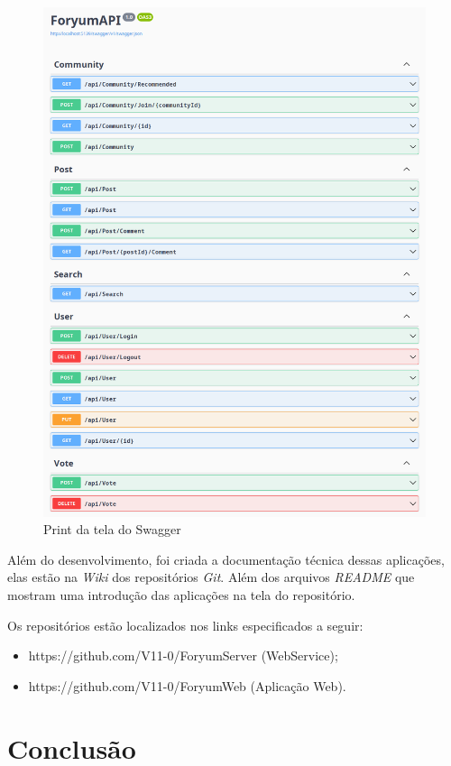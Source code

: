 \documentclass[12pt]{article}
\begin{document}
\begin{figure}[H]
    \centering
    \includegraphics[width=1\textwidth]{prints/swagger.png}
    \caption{Print da tela do Swagger}\label{fig:swagger}
\end{figure}

Além do desenvolvimento, foi criada a documentação técnica dessas aplicações, elas estão
na \textit{Wiki} dos repositórios \textit{Git}. Além dos arquivos \textit{README} que mostram
uma introdução das aplicações na tela do repositório.

Os repositórios estão localizados nos links especificados a seguir:
\begin{itemize}
	\item https://github.com/V11-0/ForyumServer (WebService);
	\item https://github.com/V11-0/ForyumWeb (Aplicação Web).
\end{itemize}

\section{Conclusão}\label{Conclusao}
\end{document}
